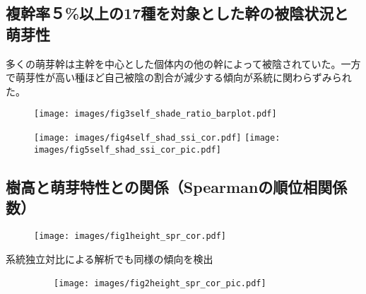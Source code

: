 \documentclass[a0, 30pt, plainboxedsections]{sciposter} %
\renewcommand{\baselinestretch}{1.2}
\begin{document}
\begin{multicols}{2}
\renewcommand{\baselinestretch}{0.8}
\begin{mdframed}[style=subsection.frame,frametitle=
  \huge\textbf{\color{Black1}{\LARGE{\ding{194}}\Large{萌芽性が強い種ほど自己被陰率が下がる}}}]
\renewcommand{\baselinestretch}{1.2}

\subsection*{複幹率５\%以上の17種を対象とした幹の被陰状況と萌芽性}

多くの萌芽幹は主幹を中心とした個体内の他の幹によって被陰されていた。一方で萌芽性が高い種ほど自己被陰の割合が減少する傾向が系統に関わらずみられた。

\begin{multicols}{2}

\begin{figure}
	\centering
		\texttt{[image: images/fig3self\_shade\_ratio\_barplot.pdf]}
\end{figure}

\columnbreak
\begin{figure}
	\centering				
		\texttt{[image: images/fig4self\_shad\_ssi\_cor.pdf]}
		\texttt{[image: images/fig5self\_shad\_ssi\_cor\_pic.pdf]}
\end{figure}
\end{multicols}
\end{mdframed}

\columnbreak
\renewcommand{\baselinestretch}{0.8}
\begin{mdframed}[style=subsection.frame,frametitle=
  \huge\textbf{\color{Black1}{\LARGE{\ding{193}}\Large{樹高が高くなるほど萌芽性が強くなる}}}]
\renewcommand{\baselinestretch}{1.2} %

\subsection*{樹高と萌芽特性との関係（Spearmanの順位相関係数）}

\begin{figure}
	\centering
		\texttt{[image: images/fig1height\_spr\_cor.pdf]}
\end{figure}

系統独立対比による解析でも同様の傾向を検出

\begin{figure}
	\centering
	　　\texttt{[image: images/fig2height\_spr\_cor\_pic.pdf]}
\end{figure}
\end{mdframed}

\end{multicols}
\begin{mdframed}[style=section.frame]
  \centering\huge\textbf{}
\end{mdframed}
\end{document}
